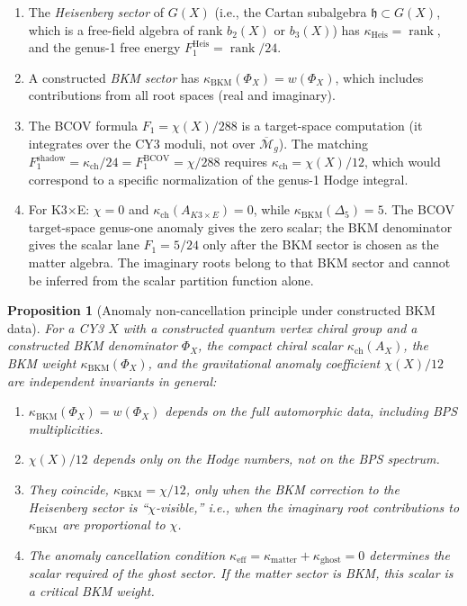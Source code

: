 \documentclass[11pt]{article}
\newtheorem{proposition}[theorem]{Proposition}
\theoremstyle{definition}
\theoremstyle{remark}
\DeclareMathOperator{\rank}{rank}
\newcommand{\Mbar}{\overline{\mathcal{M}}}
\begin{document}
\begin{enumerate}[label=(\arabic*)]
\item The \emph{Heisenberg sector} of $G(X)$ (i.e., the Cartan
 subalgebra $\mathfrak{h} \subset G(X)$, which is a free-field algebra
 of rank $b_2(X)$ or $b_3(X)$) has $\kappa_{\mathrm{Heis}} = \rank$,
 and the genus-1 free energy $F_1^{\mathrm{Heis}} = \rank/24$.

\item A constructed \emph{BKM sector} has
 $\kappa_{\mathrm{BKM}}(\Phi_X) = w(\Phi_X)$, which includes
 contributions from all root spaces (real and imaginary).

\item The BCOV formula $F_1 = \chi(X)/288$ is a target-space computation
 (it integrates over the CY3 moduli, not over $\Mbar_g$). The matching
 $F_1^{\mathrm{shadow}} = \kappa_{\mathrm{ch}}/24 = F_1^{\mathrm{BCOV}} = \chi/288$
 requires $\kappa_{\mathrm{ch}} = \chi(X)/12$, which would correspond to a specific
 normalization of the genus-1 Hodge integral.

\item For K3$\times$E: $\chi=0$ and
 $\kappa_{\mathrm{ch}}(A_{K3\times E})=0$, while
 $\kappa_{\mathrm{BKM}}(\Delta_5)=5$. The BCOV target-space genus-one
 anomaly gives the zero scalar; the BKM denominator gives the scalar
 lane $F_1=5/24$ only after the BKM sector is chosen as the matter
 algebra. The imaginary roots belong to that BKM sector and cannot be
 inferred from the scalar partition function alone.
\end{enumerate}

\begin{proposition}[Anomaly non-cancellation principle under constructed BKM data]
\label{thm:non-cancellation}
For a CY3 $X$ with a constructed quantum vertex chiral group and a
constructed BKM denominator $\Phi_X$, the compact chiral scalar
$\kappa_{\mathrm{ch}}(A_X)$, the BKM weight
$\kappa_{\mathrm{BKM}}(\Phi_X)$, and the gravitational anomaly
coefficient $\chi(X)/12$ are independent invariants in general:
\begin{enumerate}[label=\textup{(\roman*)}]
\item $\kappa_{\mathrm{BKM}}(\Phi_X)=w(\Phi_X)$ depends on the full
 automorphic data, including BPS multiplicities.
\item $\chi(X)/12$ depends only on the Hodge numbers, not on the BPS
 spectrum.
\item They coincide, $\kappa_{\mathrm{BKM}} = \chi/12$, only when the BKM correction
 to the Heisenberg sector is ``$\chi$-visible,'' i.e., when the
 imaginary root contributions to $\kappa_{\mathrm{BKM}}$ are proportional to $\chi$.
\item The anomaly cancellation condition
 $\kappa_{\mathrm{eff}} = \kappa_{\mathrm{matter}} + \kappa_{\mathrm{ghost}} = 0$
 determines the scalar required of the ghost sector. If the matter sector
 is BKM, this scalar is a critical BKM weight.
\end{enumerate}
\end{proposition}
\end{document}
